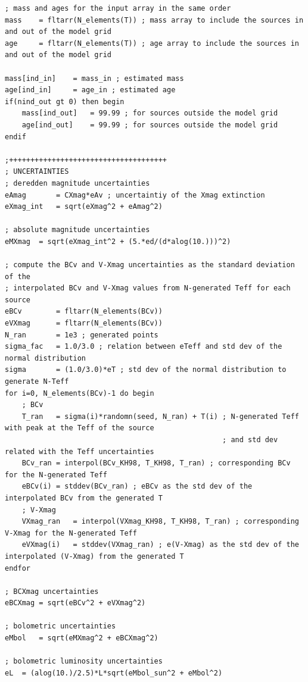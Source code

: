 \documentclass[12pt]{article}
\begin{document}
{\begin{Verbatim}[tabsize=4]
; mass and ages for the input array in the same order
mass	= fltarr(N_elements(T)) ; mass array to include the sources in and out of the model grid
age		= fltarr(N_elements(T)) ; age array to include the sources in and out of the model grid

mass[ind_in]	= mass_in ; estimated mass
age[ind_in]		= age_in ; estimated age
if(nind_out gt 0) then begin
	mass[ind_out]	= 99.99 ; for sources outside the model grid
	age[ind_out]	= 99.99 ; for sources outside the model grid
endif

;+++++++++++++++++++++++++++++++++++++
; UNCERTAINTIES
; deredden magnitude uncertainties
eAmag		= CXmag*eAv ; uncertaintiy of the Xmag extinction
eXmag_int	= sqrt(eXmag^2 + eAmag^2)

; absolute magnitude uncertainties
eMXmag	= sqrt(eXmag_int^2 + (5.*ed/(d*alog(10.)))^2)

; compute the BCv and V-Xmag uncertainties as the standard deviation of the 
; interpolated BCv and V-Xmag values from N-generated Teff for each source
eBCv		= fltarr(N_elements(BCv)) 
eVXmag 		= fltarr(N_elements(BCv))
N_ran		= 1e3 ; generated points
sigma_fac	= 1.0/3.0 ; relation between eTeff and std dev of the normal distribution
sigma		= (1.0/3.0)*eT ; std dev of the normal distribution to generate N-Teff
for i=0, N_elements(BCv)-1 do begin
	; BCv
	T_ran	= sigma(i)*randomn(seed, N_ran) + T(i) ; N-generated Teff with peak at the Teff of the source 
												   ; and std dev related with the Teff uncertainties
	BCv_ran	= interpol(BCv_KH98, T_KH98, T_ran) ; corresponding BCv for the N-generated Teff
	eBCv(i)	= stddev(BCv_ran) ; eBCv as the std dev of the interpolated BCv from the generated T
	; V-Xmag
	VXmag_ran	= interpol(VXmag_KH98, T_KH98, T_ran) ; corresponding V-Xmag for the N-generated Teff
	eVXmag(i)	= stddev(VXmag_ran) ; e(V-Xmag) as the std dev of the interpolated (V-Xmag) from the generated T
endfor

; BCXmag uncertainties
eBCXmag	= sqrt(eBCv^2 + eVXmag^2)

; bolometric uncertainties
eMbol	= sqrt(eMXmag^2 + eBCXmag^2)

; bolometric luminosity uncertainties
eL	= (alog(10.)/2.5)*L*sqrt(eMbol_sun^2 + eMbol^2)


\end{Verbatim}}
\end{document}
